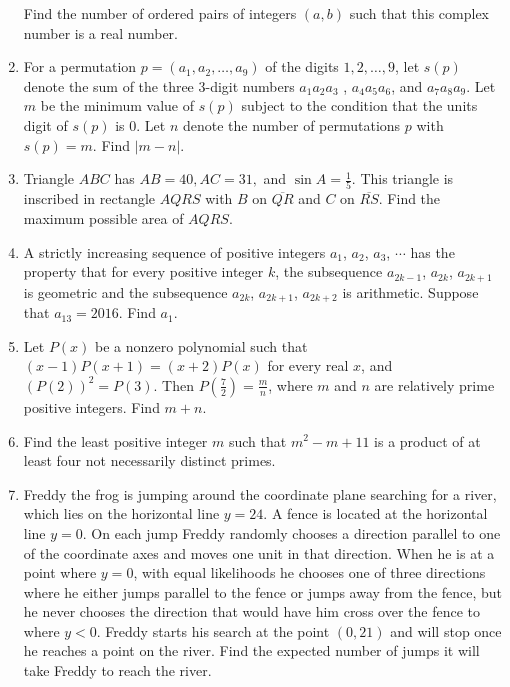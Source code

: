 \documentclass{article}
\begin{document}
\begin{enumerate}[label=\arabic*., itemsep=0.5em]
\begin{equation*}
\end{equation*}
 Find the number of ordered pairs of integers \((a,b)\) such that this complex number is a real number.\par \vspace{0.5em}\item For a permutation \(p = (a_1,a_2,\ldots,a_9)\) of the digits \(1,2,\ldots,9\), let \(s(p)\) denote the sum of the three \(3\)-digit numbers \(a_1a_2a_3\) , \(a_4a_5a_6\), and \(a_7a_8a_9\). Let \(m\) be the minimum value of \(s(p)\) subject to the condition that the units digit of \(s(p)\) is \(0\). Let \(n\) denote the number of permutations \(p\) with \(s(p) = m\). Find \(|m - n|\).\par \vspace{0.5em}\item Triangle \(ABC\) has \(AB=40,AC=31,\) and \(\sin{A}=\frac{1}{5}\). This triangle is inscribed in rectangle \(AQRS\) with \(B\) on \(\overline{QR}\) and \(C\) on \(\overline{RS}\). Find the maximum possible area of \(AQRS\).\par \vspace{0.5em}\item A strictly increasing sequence of positive integers \(a_1\), \(a_2\), \(a_3\), \(\cdots\) has the property that for every positive integer \(k\), the subsequence \(a_{2k-1}\), \(a_{2k}\), \(a_{2k+1}\) is geometric and the subsequence \(a_{2k}\), \(a_{2k+1}\), \(a_{2k+2}\) is arithmetic. Suppose that \(a_{13} = 2016\). Find \(a_1\).\par \vspace{0.5em}\item Let \(P(x)\) be a nonzero polynomial such that \((x-1)P(x+1)=(x+2)P(x)\) for every real \(x\), and \(\left(P(2)\right)^2 = P(3)\). Then \(P(\tfrac72)=\tfrac{m}{n}\), where \(m\) and \(n\) are relatively prime positive integers. Find \(m + n\).\par \vspace{0.5em}\item Find the least positive integer \(m\) such that \(m^2 - m + 11\) is a product of at least four not necessarily distinct primes.\par \vspace{0.5em}\item Freddy the frog is jumping around the coordinate plane searching for a river, which lies on the horizontal line \(y = 24\). A fence is located at the horizontal line \(y = 0\). On each jump Freddy randomly chooses a direction parallel to one of the coordinate axes and moves one unit in that direction. When he is at a point where \(y=0\), with equal likelihoods he chooses one of three directions where he either jumps parallel to the fence or jumps away from the fence, but he never chooses the direction that would have him cross over the fence to where \(y < 0\). Freddy starts his search at the point \((0, 21)\) and will stop once he reaches a point on the river. Find the expected number of jumps it will take Freddy to reach the river.\par 
\end{enumerate}
\end{document}

